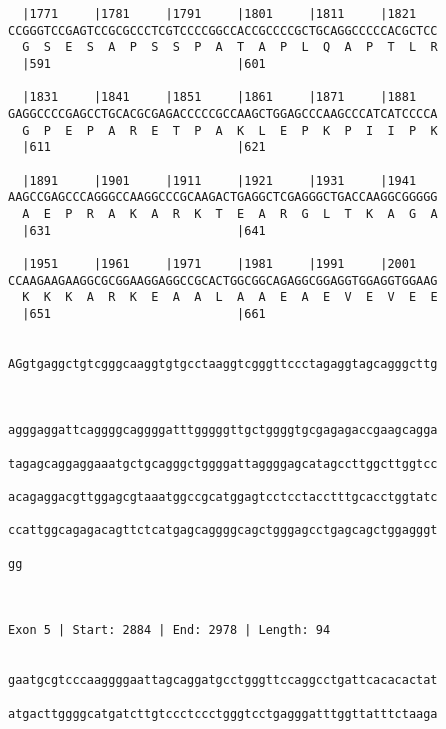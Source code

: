 \documentclass{article}
\begin{document}
\begin{Verbatim}
  |1771     |1781     |1791     |1801     |1811     |1821   
CCGGGTCCGAGTCCGCGCCCTCGTCCCCGGCCACCGCCCCGCTGCAGGCCCCCACGCTCC
  G  S  E  S  A  P  S  S  P  A  T  A  P  L  Q  A  P  T  L  R
  |591                          |601                        
  
  |1831     |1841     |1851     |1861     |1871     |1881   
GAGGCCCCGAGCCTGCACGCGAGACCCCCGCCAAGCTGGAGCCCAAGCCCATCATCCCCA
  G  P  E  P  A  R  E  T  P  A  K  L  E  P  K  P  I  I  P  K
  |611                          |621                        
  
  |1891     |1901     |1911     |1921     |1931     |1941   
AAGCCGAGCCCAGGGCCAAGGCCCGCAAGACTGAGGCTCGAGGGCTGACCAAGGCGGGGG
  A  E  P  R  A  K  A  R  K  T  E  A  R  G  L  T  K  A  G  A
  |631                          |641                        
  
  |1951     |1961     |1971     |1981     |1991     |2001   
CCAAGAAGAAGGCGCGGAAGGAGGCCGCACTGGCGGCAGAGGCGGAGGTGGAGGTGGAAG
  K  K  K  A  R  K  E  A  A  L  A  A  E  A  E  V  E  V  E  E
  |651                          |661                        
  
                                                            
AGgtgaggctgtcgggcaaggtgtgcctaaggtcgggttccctagaggtagcagggcttg
                                                            
                                                            
  
agggaggattcaggggcaggggatttgggggttgctggggtgcgagagaccgaagcagga
                                                            
tagagcaggaggaaatgctgcagggctggggattaggggagcatagccttggcttggtcc
                                                            
acagaggacgttggagcgtaaatggccgcatggagtcctcctacctttgcacctggtatc
                                                            
ccattggcagagacagttctcatgagcaggggcagctgggagcctgagcagctggagggt
                                                            
gg
  
  
 
Exon 5 | Start: 2884 | End: 2978 | Length: 94


gaatgcgtcccaaggggaattagcaggatgcctgggttccaggcctgattcacacactat
                                                            
atgacttggggcatgatcttgtccctccctgggtcctgagggatttggttatttctaaga
                                                            

\end{Verbatim}
\end{document}
